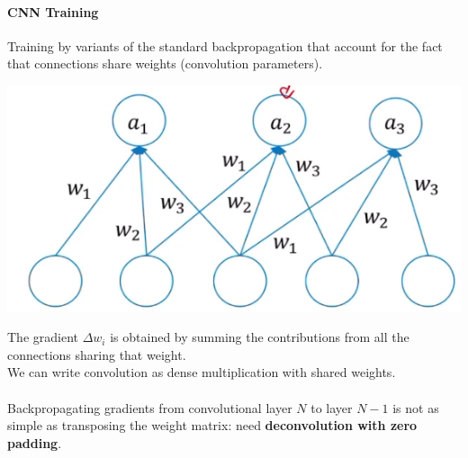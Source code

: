 \documentclass[10pt]{report}
\begin{document}
\paragraph{CNN Training}
Training by variants of the standard backpropagation that account for the fact that connections share weights (convolution parameters).
\begin{multicols}{2}
\begin{center}
	\includegraphics[scale=0.5]{62.png}
\end{center}
The gradient $\Delta w_i$ is obtained by summing the contributions from all the connections sharing that weight.\\
We can write convolution as dense multiplication with shared weights.\\\\
Backpropagating gradients from convolutional layer $N$ to layer $N-1$ is not as simple as transposing the weight matrix: need \textbf{deconvolution with zero padding}.
\end{multicols}
\end{document}
